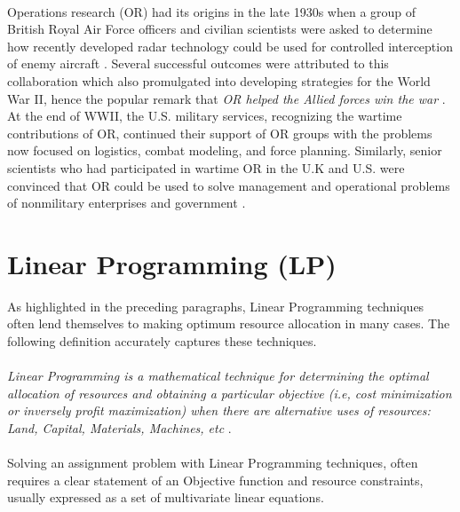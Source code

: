 \documentclass[a4paper,openany]{book}
\begin{document}
		\paragraph{}
			Operations research (OR) had its origins in the late 1930s when a group of British Royal Air Force officers and civilian scientists were asked to determine how recently developed radar technology could be used for controlled interception of enemy aircraft \cite{arjang}. Several successful outcomes were attributed to this collaboration which also promulgated into developing strategies for the World War II, hence the popular remark that \textit{OR helped the Allied forces win the war} \cite{arjang}. At the end of WWII, the U.S. military services, recognizing the wartime contributions of OR, continued their support of OR groups with the problems now focused on logistics, combat modeling, and force planning. Similarly, senior scientists who had participated in wartime OR in the U.K and U.S. were convinced that OR could be used to solve management and operational problems of nonmilitary enterprises and government \cite{arjang}. 
		\paragraph{}
		\section{Linear Programming (LP)}
			As highlighted in the preceding paragraphs, Linear Programming techniques often lend themselves to making optimum resource allocation in many cases. The following definition accurately captures these techniques.\\
			\paragraph{}
				\textit{Linear Programming is a mathematical technique for determining the optimal allocation of resources and obtaining a particular objective (i.e, cost minimization or inversely profit maximization) when there are alternative uses of resources: Land, Capital, Materials, Machines, etc} \cite{stats}.
			\paragraph{}
				Solving an assignment problem with Linear Programming techniques, often requires a clear statement of an Objective function and resource constraints, usually expressed as a set of multivariate linear equations.
\end{document}
